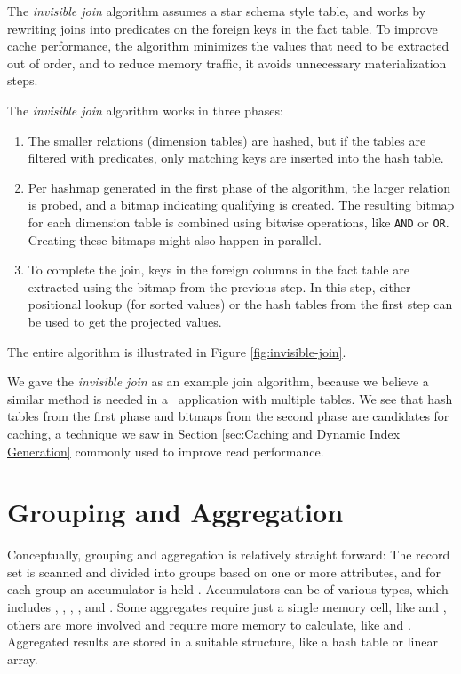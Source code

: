 The \textit{invisible join} algorithm assumes a star schema style table, and works by rewriting joins into predicates on the foreign keys in the fact table. To improve cache performance, the algorithm minimizes the values that need to be extracted out of order, and to reduce memory traffic, it avoids unnecessary materialization steps. 

The \textit{invisible join} algorithm works in three phases:
\begin{enumerate}
  \item The smaller relations (dimension tables) are hashed, but if the tables are filtered with predicates, only matching keys are inserted into the hash table.
  \item Per hashmap generated in the first phase of the algorithm, the larger relation is probed, and a bitmap indicating qualifying is created. The resulting bitmap for each dimension table is combined using bitwise operations, like \texttt{AND} or \texttt{OR}. Creating these bitmaps might also happen in parallel. 
  \item To complete the join, keys in the foreign columns in the fact table are extracted using the bitmap from the previous step. In this step, either positional lookup (for sorted values) or the hash tables from the first step can be used to get the projected values.
\end{enumerate}
The entire algorithm is illustrated in Figure \ref{fig:invisible-join}.

We gave the \textit{invisible join} as an example join algorithm, because we believe a similar method is needed in a \bd~application with multiple tables. We see that hash tables from the first phase and bitmaps from the second phase are candidates for caching, a technique we saw in Section \ref{sec:Caching and Dynamic Index Generation} commonly used to improve read performance.



\section{Grouping and Aggregation}
\label{sec:Grouping and Aggregation}
Conceptually, grouping and aggregation is relatively straight forward: The record set is scanned and divided into groups based on one or more attributes, and for each group an accumulator is held \cite{Bratbergsengen2015-ed}. Accumulators can be of various types, which includes , , , , and . Some aggregates require just a single memory cell, like  and , others are more involved and require more memory to calculate, like  and . Aggregated results are stored in a suitable structure, like a hash table or linear array. 

